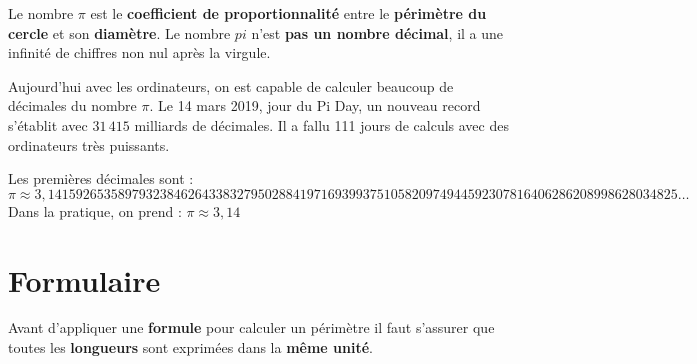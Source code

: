 \begin{pageCours}
\begin{Def}
Le nombre $\pi$ est le \textbf{coefficient de proportionnalité} entre le \textbf{périmètre du cercle} et son \textbf{diamètre}. Le nombre $pi$ n'est \textbf{pas un nombre décimal}, il a une infinité de chiffres non nul après la virgule.
\end{Def}

\begin{Rq}
Aujourd'hui avec les ordinateurs, on est capable de calculer beaucoup de décimales du nombre $\pi$. Le 14 mars 2019, jour du Pi Day, un nouveau record s'établit avec \textcolor{sacado_green}{$31\,415$ milliards} de décimales. Il a fallu 111 jours de calculs avec des ordinateurs très puissants.

Les premières décimales sont :
\[\pi \approx 3,1415926535 8979323846 2643383279 5028841971 6939937510 5820974944
5923078164 0628620899 8628034825…\]
Dans la pratique, on prend : $\pi \approx 3,14$
\end{Rq}

\section{Formulaire}

\begin{Att}
Avant d'appliquer une \textbf{formule} pour calculer un périmètre il faut s'assurer que toutes les \textbf{longueurs} sont exprimées dans la \textbf{même unité}.
\end{Att}


\end{pageCours}
